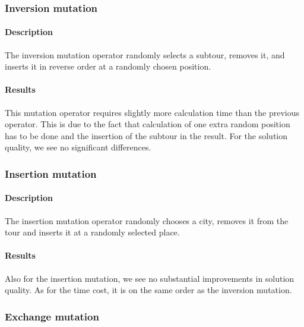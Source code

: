 \documentclass[a4paper,english,11pt,]{scrartcl}
\begin{document}
\subsubsection{Inversion mutation}
% 
\paragraph{Description}
The inversion mutation operator randomly selects a subtour, removes it, and inserts it in reverse order at a randomly chosen position.

\paragraph{Results}
This mutation operator requires slightly more calculation time than the previous operator. This is due to the fact that calculation of one extra random position has to be done and the insertion of the subtour in the result.
For the solution quality, we see no significant differences.




\subsubsection{Insertion mutation}
% 
\paragraph{Description}
The insertion mutation operator randomly chooses a city, removes it from the tour and inserts it at a randomly selected place. 



\paragraph{Results}
Also for the insertion mutation, we see no substantial improvements in solution quality. As for the time cost, it is on the same order as the inversion mutation.


\subsubsection{Exchange mutation}
% 
\end{document}
